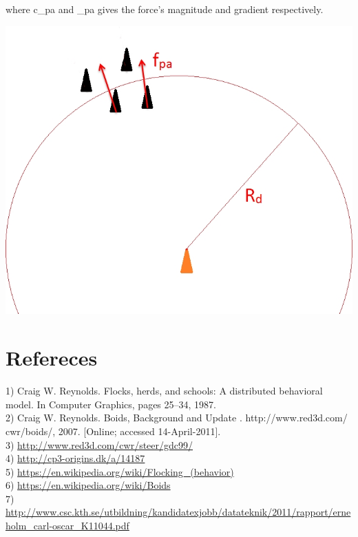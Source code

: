 \documentclass{article}
\begin{document}
where c_{pa} and \omega _{pa} gives the force's magnitude and gradient respectively.
\begin{center}
\includegraphics[scale=0.4]{fig3.png} 
\end{center}

\pagebreak

\section{Refereces}
1) Craig W. Reynolds. Flocks, herds, and schools: A distributed behavioral model. In Computer Graphics, pages 25–34, 1987.\\
2) Craig W. Reynolds. Boids, Background and Update . http://www.red3d.com/ cwr/boids/, 2007. [Online; accessed 14-April-2011]. \\
3) \href{http://www.red3d.com/cwr/steer/gdc99/}{http://www.red3d.com/cwr/steer/gdc99/}\\
4) \href{http://cp3-origins.dk/a/14187}{http://cp3-origins.dk/a/14187}\\
5) \href{https://en.wikipedia.org/wiki/Flocking_(behavior)}{https://en.wikipedia.org/wiki/Flocking_(behavior)}\\
6) \href{https://en.wikipedia.org/wiki/Boids}{https://en.wikipedia.org/wiki/Boids}\\
7) \href{http://www.csc.kth.se/utbildning/kandidatexjobb/datateknik/2011/rapport/erneholm_carl-oscar_K11044.pdf}{http://www.csc.kth.se/utbildning/kandidatexjobb/datateknik/2011/rapport/erneholm_carl-oscar_K11044.pdf}
\end{document}
